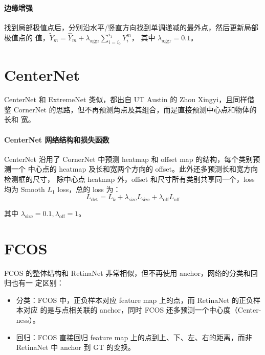 \paragraph{边缘增强}
找到局部极值点后，分别沿水平/竖直方向找到单调递减的最外点，然后更新局部极值点的
值，$\tilde{Y}_m = \hat{Y}_m + \lambda_{\mathrm{aggr}}\sum_{i=i_0}^{i_1}Y_i^m$，
其中 $\lambda_{\mathrm{aggr}}=0.1$。

\section{CenterNet}
\label{sec:CenterNet}
CenterNet 和 ExtremeNet 类似，都出自 UT Austin 的 Zhou Xingyi，且同样借
鉴 CornerNet 的思路，但不再预测角点及其组合，而是直接预测中心点和物体的长和
宽。

\paragraph{CenterNet 网络结构和损失函数}
CenterNet 沿用了 CornerNet 中预测 heatmap 和 offset map 的结构，每个类别预测一个
中心点的 heatmap 及长和宽两个方向的 offset。此外还多预测长和宽方向检测框的尺寸，
除中心点 heatmap 外，offset 和尺寸所有类别共享同一个，loss 均为 Smooth $L_1$
loss，总的 loss 为：
\begin{equation}
  \label{equ:extreme-net-loss}
  L_{\mathrm{det}} = L_k + \lambda_{\mathrm{size}}L_{\mathrm{size}} + \lambda_{\mathrm{off}}L_{\mathrm{off}}
\end{equation}

其中 $\lambda_{\mathrm{size}}=0.1, \lambda_{\mathrm{off}}=1$。

\section{FCOS}
\label{sec:FCOS}
FCOS 的整体结构和 RetinaNet 非常相似，但不再使用 anchor，网络的分类和回归也有一
定区别：

\begin{itemize}
  \item 分类：FCOS 中，正负样本对应 feature map 上的点，而 RetinaNet 的正负样本对应
    的是与点相关联的 anchor，同时 FCOS 还多预测一个中心度（Center-ness）。
  \item 回归：FCOS 直接回归 feature map 上的点到上、下、左、右的距离，而非 RetinaNet
    中 anchor 到 GT 的变换。
\end{itemize}


